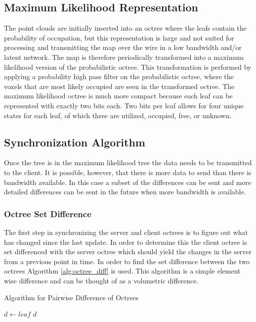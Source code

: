 \documentclass[12pt]{report}
\begin{document}
\subsection{Maximum Likelihood Representation}
The point clouds are initially inserted into an octree where the leafs contain the probability of occupation, but this representation is large and not suited for processing and transmitting the map over the wire in a low bandwidth and/or latent network. The map is therefore periodically transformed into a maximum likelihood version of the probabilistic octree. This transformation is performed by applying a probability high pass filter on the probabilistic octree, where the voxels that are most likely occupied are seen in the transformed octree. The maximum likelihood octree is much more compact because each leaf can be represented with exactly two bits each.\cite{octomap}  Two bits per leaf allows for four unique states for each leaf, of which three are utilized, occupied, free, or unknown.

\subsection{Synchronization Algorithm}
Once the tree is in the maximum likelihood tree the data needs to be transmitted to the client. It is possible, however, that there is more data to send than there is bandwidth available. In this case a subset of the differences can be sent and more detailed differences can be sent in the future when more bandwidth is available.

\subsubsection{Octree Set Difference}
The first step in synchronizing the server and client octrees is to figure out what has changed since the last update. In order to determine this the client octree is set differenced with the server octree which should yield the changes in the server from a previous point in time. In order to find the set difference between the two octrees Algorithm \ref{alg:octree_diff} is used. This algorithm is a simple element wise difference and can be thought of as a volumetric difference.

\begin{algorithm}
\caption{Algorithm for Pairwise Difference of Octrees}
\label{alg:octree_diff}
\begin{algorithmic}
  \STATE {}
  \STATE {}
  \STATE {}
      \STATE $d\gets leaf$
    \ENDIF
  \ENDFOR
  \RETURN $d$
\end{algorithmic}
\end{algorithm}
\end{document}
